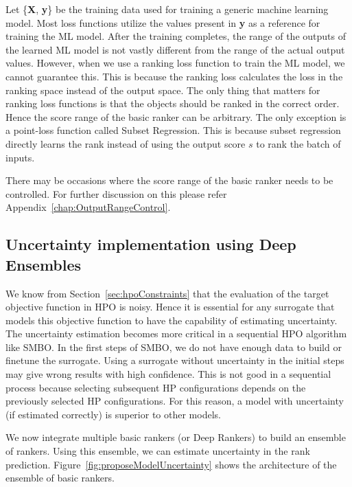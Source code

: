 \documentclass[12pt, twoside, ngerman]{report}
\begin{document}
Let  \{\textbf{X}, \textbf{y}\} be the training data used for training a generic machine learning model.
Most loss functions utilize the values present in \textbf{y} as a reference for training the ML model.
After the training completes, the range of the outputs of the learned ML model is not vastly different from the range of the actual output values.
However, when we use a ranking loss function to train the ML model, we cannot guarantee this. This is because the ranking loss calculates the loss in the ranking space instead of the output space.
The only thing that matters for ranking loss functions is that the objects should be ranked in the correct order.
Hence the score range of the basic ranker can be arbitrary.
The only exception is a point-loss function called Subset Regression.
This is because subset regression directly learns the rank instead of using the output score $s$ to rank the batch of inputs.

There may be occasions where the score range of the basic ranker needs to be controlled.
For further discussion on this please refer Appendix~\ref{chap:OutputRangeControl}.


\subsection{Uncertainty implementation using Deep Ensembles}\label{sec:UncertaintyImplementation}

We know from Section~\ref{sec:hpoConstraints} that the evaluation of the target objective function in HPO is noisy.
Hence it is essential for any surrogate that models this objective function to have the capability of estimating uncertainty.
The uncertainty estimation becomes more critical in a sequential HPO algorithm like SMBO.
In the first steps of SMBO, we do not have enough data to build or finetune the surrogate.
Using a surrogate without uncertainty in the initial steps may give wrong results with high confidence.
This is not good in a sequential process because selecting subsequent HP configurations depends on the previously selected HP configurations.
For this reason, a model with uncertainty (if estimated correctly) is superior to other models.


We now integrate multiple basic rankers (or Deep Rankers) to build an ensemble of rankers.
Using this ensemble, we can estimate uncertainty in the rank prediction.
Figure~\ref{fig:proposeModelUncertainty} shows the architecture of the ensemble of basic rankers.
\end{document}
